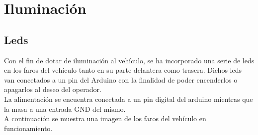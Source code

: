 \section{Iluminación}


\subsection{Leds}

Con el fin de dotar de iluminación al vehículo, se ha incorporado una serie de leds en los faros del vehículo tanto en su parte delantera como trasera. Dichos leds van concetados
a un pin del Arduino con la finalidad de poder encenderlos o apagarlos al deseo del operador. \\

La alimentación se encuentra conectada a un pin digital del arduino mientras que la masa a una entrada GND del mismo.\\

A continuación se muestra una imagen de los faros del vehículo en funcionamiento.\\


